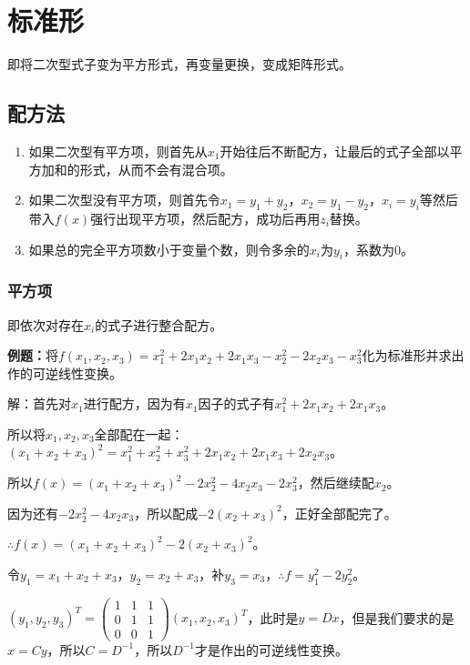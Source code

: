 \documentclass[UTF8, 12pt]{ctexart}
\begin{document}
\section{标准形}

即将二次型式子变为平方形式，再变量更换，变成矩阵形式。

\subsection{配方法}

\begin{enumerate}
    \item 如果二次型有平方项，则首先从$x_1$开始往后不断配方，让最后的式子全部以平方加和的形式，从而不会有混合项。
    \item 如果二次型没有平方项，则首先令$x_1=y_1+y_2$，$x_2=y_1-y_2$，$x_i=y_i$等然后带入$f(x)$强行出现平方项，然后配方，成功后再用$z_i$替换。
    \item 如果总的完全平方项数小于变量个数，则令多余的$x_i$为$y_i$，系数为0。
\end{enumerate}

\subsubsection{平方项}

即依次对存在$x_i$的式子进行整合配方。

\textbf{例题：}将$f(x_1,x_2,x_3)=x_1^2+2x_1x_2+2x_1x_3-x_2^2-2x_2x_3-x_3^2$化为标准形并求出作的可逆线性变换。

解：首先对$x_1$进行配方，因为有$x_1$因子的式子有$x_1^2+2x_1x_2+2x_1x_3$。

所以将$x_1,x_2,x_3$全部配在一起：$(x_1+x_2+x_3)^2=x_1^2+x_2^2+x_3^2+2x_1x_2+2x_1x_3+2x_2x_3$。

所以$f(x)=(x_1+x_2+x_3)^2-2x_2^2-4x_2x_3-2x_3^2$，然后继续配$x_2$。

因为还有$-2x_2^2-4x_2x_3$，所以配成$-2(x_2+x_3)^2$，正好全部配完了。

$\therefore f(x)=(x_1+x_2+x_3)^2-2(x_2+x_3)^2$。

令$y_1=x_1+x_2+x_3$，$y_2=x_2+x_3$，补$y_3=x_3$，$\therefore f=y_1^2-2y_2^2$。

$(y_1,y_2,y_3)^T=\left(\begin{array}{ccc}
    1 & 1 & 1 \\
    0 & 1 & 1 \\
    0 & 0 & 1
\end{array}\right)(x_1,x_2,x_3)^T$，此时是$y=Dx$，但是我们要求的是$x=Cy$，所以$C=D^{-1}$，所以$D^{-1}$才是作出的可逆线性变换。
\end{document}
